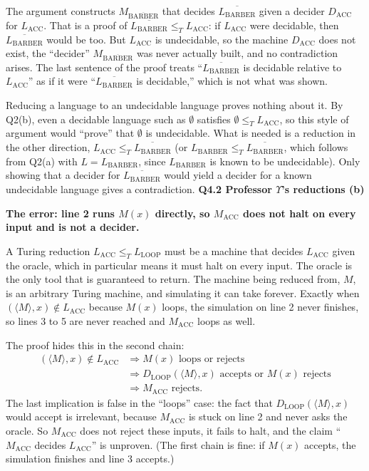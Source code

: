 \documentclass[11pt]{article}
\newcommand{\inner}[1]{\langle #1 \rangle}
\newcommand{\lT}{\leq_T}
\newcommand{\Lacc}{L_{\text{ACC}}}
\newcommand{\Lb}{L_{\text{BARBER}}}
\newcommand{\Lloop}{L_{\text{LOOP}}}
\newcommand{\Mb}{M_{\overline{\text{BARBER}}}}
\newcommand{\qpage}[1]{\clearpage\noindent\textbf{\large #1}\par\medskip}
\begin{document}
The argument constructs $\Mb$ that decides $\overline{\Lb}$ given a decider $D_{\text{ACC}}$ for $\Lacc$.
That is a proof of $\overline{\Lb} \lT \Lacc$: if $\Lacc$ were decidable, then $\overline{\Lb}$ would be too.
But $\Lacc$ is undecidable, so the machine $D_{\text{ACC}}$ does not exist, the ``decider'' $\Mb$ was never actually built, and no contradiction arises.
The last sentence of the proof treats ``$\overline{\Lb}$ is decidable relative to $\Lacc$'' as if it were ``$\overline{\Lb}$ is decidable,'' which is not what was shown.

Reducing a language to an undecidable language proves nothing about it.
By Q2(b), even a decidable language such as $\emptyset$ satisfies $\emptyset \lT \Lacc$, so this style of argument would ``prove'' that $\emptyset$ is undecidable.
What is needed is a reduction in the other direction, $\Lacc \lT \overline{\Lb}$ (or $\Lb \lT \overline{\Lb}$, which follows from Q2(a) with $L = \Lb$, since $\Lb$ is known to be undecidable).
Only showing that a decider for $\overline{\Lb}$ would yield a decider for a known undecidable language gives a contradiction.
\qpage{Q4.2 Professor $\Upsilon$'s reductions (b)}

\textbf{The error: line 2 runs $M(x)$ directly, so $M_{\text{ACC}}$ does not halt on every input and is not a decider.}

A Turing reduction $\Lacc \lT \Lloop$ must be a machine that decides $\Lacc$ given the oracle, which in particular means it must halt on every input.
The oracle is the only tool that is guaranteed to return.
The machine being reduced from, $M$, is an arbitrary Turing machine, and simulating it can take forever.
Exactly when $(\inner{M}, x) \notin \Lacc$ because $M(x)$ loops, the simulation on line 2 never finishes, so lines 3 to 5 are never reached and $M_{\text{ACC}}$ loops as well.

The proof hides this in the second chain:
\begin{align*}
  (\inner{M}, x) \notin \Lacc &\Longrightarrow M(x) \text{ loops or rejects} \\
  &\Longrightarrow D_{\text{LOOP}}(\inner{M}, x) \text{ accepts or } M(x) \text{ rejects} \\
  &\Longrightarrow M_{\text{ACC}} \text{ rejects}.
\end{align*}
The last implication is false in the ``loops'' case: the fact that $D_{\text{LOOP}}(\inner{M}, x)$ would accept is irrelevant, because $M_{\text{ACC}}$ is stuck on line 2 and never asks the oracle.
So $M_{\text{ACC}}$ does not reject these inputs, it fails to halt, and the claim ``$M_{\text{ACC}}$ decides $\Lacc$'' is unproven.
(The first chain is fine: if $M(x)$ accepts, the simulation finishes and line 3 accepts.)
\end{document}
